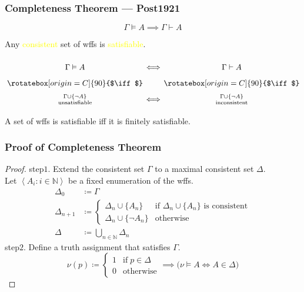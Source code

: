 \documentclass[UTF8,aspectratio=43,11pt,colorlinks,compress,openany]{beamer}%
\begin{document}
\begin{frame}\frametitle{Completeness Theorem --- Post1921}
		\begin{theorem}
			\[\Gamma\vDash A\implies\Gamma\vdash A\]
		\end{theorem}
		\begin{corollary}
			Any \textcolor{yellow}{consistent} set of wffs is \textcolor{yellow}{satisfiable}.
		\end{corollary}\vspace*{-3ex}
			{\Large \[\arraycolsep=0.7pt\def\arraystretch{1.7}
					\begin{array}{cccc}
					&\Gamma\vDash A&\iff&\Gamma\vdash A\\
					&\rotatebox[origin=C]{90}{$\iff$}&&\rotatebox[origin=C]{90}{$\iff$}\\
					&\Gamma\cup\{\neg A\}\atop{\text{unsatisfiable}}&\iff&\Gamma\cup\{\neg A\}\atop{\text{inconsistent}}
					\end{array}
					\]}
		\begin{corollary}
			A set of wffs is satisfiable iff it is finitely satisfiable.
		\end{corollary}
\end{frame}

\begin{frame}\frametitle{Proof of Completeness Theorem}
	\begin{proof}
		step$1$. Extend the consistent set $\Gamma$ to a maximal consistent set $\Delta$.\\
		Let $\left\langle A_i: i\in\mathbb{N}\right\rangle$ be a fixed enumeration of the wffs.
		\begin{align*}
		\Delta_0&\coloneqq \Gamma\\
		\Delta_{n+1}&\coloneqq 
		\begin{cases}
		\Delta_n\cup\{A_n\} &\text{if $\Delta_n\cup\{A_n\}$ is consistent}\\
		\Delta_n\cup\{\neg A_n\} &\text{otherwise}
		\end{cases}\\
		\Delta&\coloneqq \bigcup\limits_{n\in\mathbb{N}}\Delta_n
		\end{align*}
		step$2$. Define a truth assignment that satisfies $\Gamma$.
		\[\nu(p)\coloneqq 
		\begin{cases}
		1 &\text{if}\; p\in\Delta\\
		0 &\text{otherwise}
		\end{cases}\implies\big(\nu\vDash A\iff A\in\Delta\big)\]
	\end{proof}
\end{frame}
\end{document}
